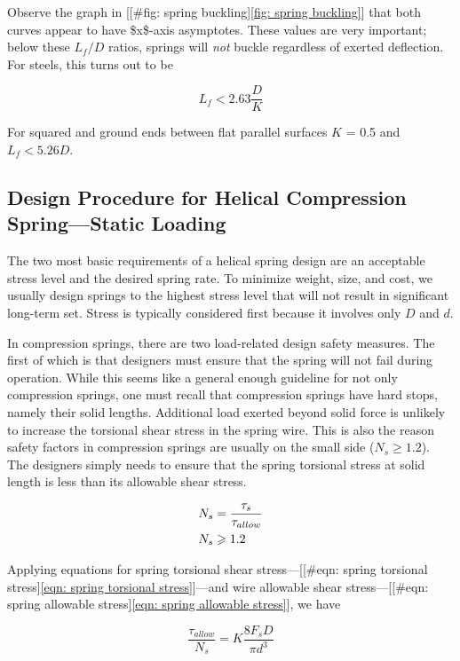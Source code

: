 \documentclass[a4paper,openany,12pt]{book}
\begin{document}
{{Observe the graph in [[\#fig: spring buckling]\ref{fig: spring buckling}]
that both curves appear to have \$x\$-axis asymptotes. These values are
very important; below these \(L_f/D\) ratios, springs will \emph{not} buckle
regardless of exerted deflection. For steels, this turns out to be

$$L_f < 2.63 \frac{D}{K}$$

For squared and ground ends between flat parallel surfaces \(K\) = 0.5 and
\(L_f < 5.26 D\).

\subsection{Design Procedure for Helical Compression Spring---Static Loading}
\label{design-procedure-for-helical-compression-springstatic-loading}
The two most basic requirements of a helical spring design are an
acceptable stress level and the desired spring rate. To minimize weight,
size, and cost, we usually design springs to the highest stress level
that will not result in significant long-term set. Stress is typically
considered first because it involves only \(D\) and \(d\).

In compression springs, there are two load-related design safety
measures. The first of which is that designers must ensure that the
spring will not fail during operation. While this seems like a general
enough guideline for not only compression springs, one must recall that
compression springs have hard stops, namely their solid lengths.
Additional load exerted beyond solid force is unlikely to increase the
torsional shear stress in the spring wire. This is also the reason
safety factors in compression springs are usually on the small side
(\(N_s \geq 1.2\)). The designers simply needs to ensure that the spring
torsional stress at solid length is less than its allowable shear
stress.

\begin{gather}
\label{eqn: spring allowable stress}
  N_s = \frac{\tau _s}{\tau _{allow}} \hfill \\
  N_s \geqslant 1.2 \hfill \\ 
\end{gather}

Applying equations for spring torsional shear
stress---[[\#eqn: spring torsional stress]\ref{eqn: spring torsional stress}]---and
wire allowable shear
stress---[[\#eqn: spring allowable stress]\ref{eqn: spring allowable stress}],
we have

$$\frac{\tau _{allow}}{N_s} = K\frac{8F_sD}{\pi d^3}$$

}}
\end{document}
